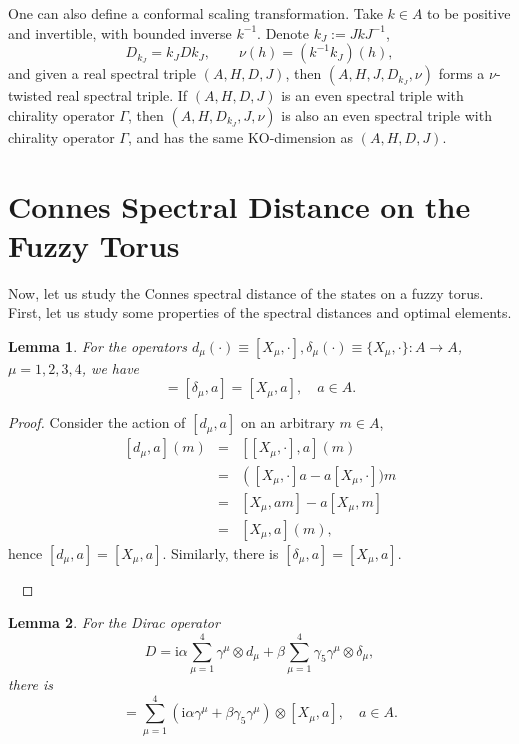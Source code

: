 \documentclass[a4paper,11pt]{article}
\newtheorem{lemma}{Lemma}
\begin{document}
One can also define a conformal scaling transformation\cite{Dabrowski1}.
Take $k \in A$ to be positive and invertible, with bounded inverse
$k^{- 1}$. Denote $k_J := JkJ^{- 1}$,
\begin{equation}
  D_{k_J} = k_J Dk_J, \qquad \nu (h) = (k^{- 1} k_J) (h),
\end{equation}
and given a real
spectral triple $(A, H, D, J)$, then $(A, H, J, D_{k_J}, \nu)$ forms a $\nu$-twisted real spectral triple. If
$(A, H, D, J)$ is an even spectral triple with chirality operator $\Gamma$,
then $(A, H, D_{k_J}, J, \nu)$ is also an even spectral triple with chirality
operator $\Gamma$, and has the same KO-dimension as $(A, H, D, J)$.




\section{Connes Spectral Distance on the Fuzzy Torus}\label{sec3}
Now, let us study the Connes spectral distance of the states on a fuzzy torus. First, let us study some properties of the spectral distances and optimal elements.
\begin{lemma}
  For the operators $d_{\mu} (\cdot) \equiv [X_{\mu}, \cdot], \delta_{\mu}
  (\cdot) \equiv \{X_{\mu}, \cdot\} : A \rightarrow A$, $\mu = 1, 2, 3, 4$, we
  have
  \begin{equation}
    [d_{\mu}, a] = [\delta_{\mu}, a] = [X_{\mu}, a], \quad a \in A.
  \end{equation}
\end{lemma}

\begin{proof}
  Consider the action of $[d_{\mu}, a]$ on an arbitrary $m \in A$,
  \begin{eqnarray}
    {}[d_{\mu}, a] (m) & = & \left[ [X_{\mu},   \cdot
     ], a \right] (m) \nonumber\\
    & = & \left( [X_{\mu},   \cdot  ] a - a
    [X_{\mu},   \cdot  ]) m \right. \nonumber\\
    & = & [X_{\mu},   am  ] - a [X_{\mu},
      m  ] \nonumber\\
    & = & [X_{\mu}, a] (m), 
  \end{eqnarray}
  hence $[d_{\mu}, a] = [X_{\mu}, a]$. Similarly, there is $[\delta_{\mu}, a]
  = [X_{\mu}, a]$.
  
  \ 
\end{proof}

\begin{lemma}
  For the Dirac operator
  \begin{equation}
    D =  \mathrm{i} \alpha \sum_{\mu = 1}^4 \gamma^{\mu}
    \otimes d_{\mu} + \beta \sum_{\mu = 1}^4 \gamma_5 \gamma^{\mu} \otimes
    \delta_{\mu},
  \end{equation}
  there is
  \begin{equation}
    [D, a] = \sum_{\mu = 1}^4 (\mathrm{i} \alpha \gamma^{\mu} + \beta \gamma_5
    \gamma^{\mu}) \otimes [X_{\mu}, a], \quad a \in A.
  \end{equation}
\end{lemma}
\end{document}
